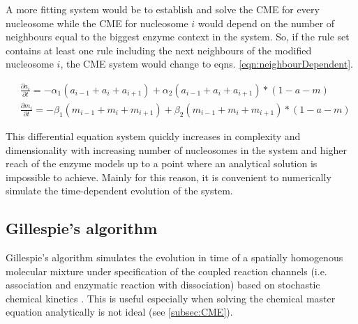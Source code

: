             A more fitting system would be to establish and solve the CME for every nucleosome while the CME for nucleosome $i$ would depend on the number of neighbours equal to the biggest enzyme context in the system. So, if the rule set contains at least one rule including the next neighbours of the modified nucleosome $i$, the CME system would change to eqns. \ref{eqn:neighbourDependent}.

            \begin{subequations}
                \begin{align}
                    &\frac{\partial a_i}{\partial t} = - \alpha_1 (a_{i-1} + a_i + a_{i+1}) + \alpha_2 (a_{i-1} + a_i + a_{i+1})*(1-a-m)\\
                    &\frac{\partial m_i}{\partial t} = - \beta_1 (m_{i-1} + m_i + m_{i+1}) + \beta_2 (m_{i-1} + m_i + m_{i+1})*(1-a-m)
                \end{align}
                \label{eqn:neighbourDependent}
            \end{subequations}

            This differential equation system quickly increases in complexity and dimensionality with increasing number of nucleosomes in the system and higher reach of the enzyme models up to a point where an analytical solution is impossible to achieve. Mainly for this reason, it is convenient to numerically simulate the time-dependent evolution of the system.
        \subsection{Gillespie's algorithm}
            Gillespie's algorithm simulates the evolution in time of a spatially homogenous molecular mixture under specification of the coupled reaction channels (i.e. association and enzymatic reaction with dissociation) based on stochastic chemical kinetics \cite{gillespie1976general, gillespie1992rigorous}. This is useful especially when solving the chemical master equation analytically is not ideal (see \ref{subsec:CME}).\\

